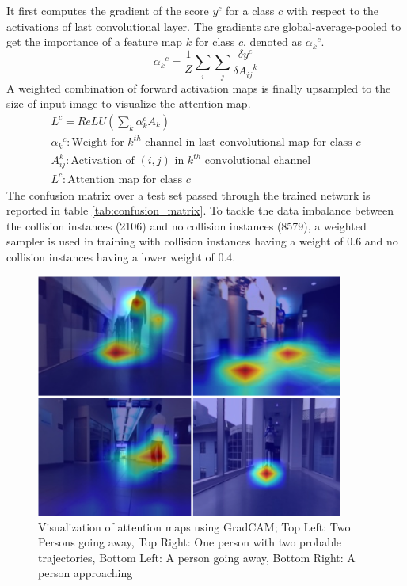 It first computes the gradient of the score $y^{c}$ for a class $c$ with respect to the activations of last convolutional layer. The gradients are global-average-pooled to get the importance of a feature map $k$ for class $c$, denoted as ${\alpha_k}^{c}$.
$$
    {\alpha_k}^{c} = \frac{1}{Z}\sum_{i}\sum_{j}\frac{\delta y^{c}}{\delta {A_{ij}}^{k}} 
$$
A weighted combination of forward activation maps is finally upsampled to the  size of input image to visualize the attention map. 
\begin{align*}
    L^{c} = ReLU(\sum_{k} \alpha_{k}^{c}A_{k})\\
    {\alpha_k}^{c}: \text{Weight for $k^{th}$ channel in last convolutional map for class $c$}\\
    A_{ij}^{k}: \text{Activation of $(i, j)$ in $k^{th}$ convolutional channel}\\
    L^{c}: \text{Attention map for class $c$}
\end{align*}
The confusion matrix over a test set passed through the trained network is reported in table \ref{tab:confusion_matrix}. To tackle the data imbalance between the collision instances (2106) and no collision instances (8579), a weighted sampler is used in training with collision instances having a weight of $0.6$ and no collision instances having a lower weight of $0.4$.

    \begin{figure}[ht]
      \centering
      \includegraphics[height=8cm, width=\columnwidth]{figs/grad_binary_class.png}
      \caption{Visualization of attention maps using GradCAM; Top Left: Two Persons going away, Top Right: One person with two probable trajectories, Bottom Left: A person going away, Bottom Right: A person approaching}
      \label{fig:gradcam1}
  \end{figure}

